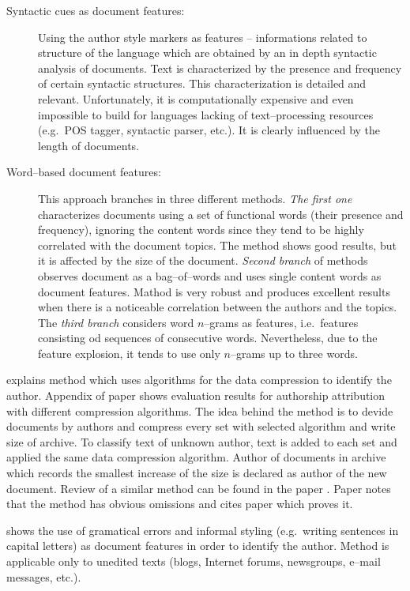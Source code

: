 \documentclass[11pt,english]{article}
\begin{document}
\begin{multicols}{2}
\begin{description}
\item[Syntactic cues as document features:] Using the author style markers as
features -- informations related to structure of the language which are obtained
by an in depth syntactic analysis of documents. Text is characterized by the
presence and frequency of certain syntactic structures. This characterization is
detailed and relevant. Unfortunately, it is computationally expensive and even
impossible to build for languages lacking of text--processing resources (e.g.\
POS tagger, syntactic parser, etc.). It is clearly influenced by the length of
documents.

\item[Word--based document features:] This approach branches in three different
methods. \emph{The first one} characterizes documents using a set of functional
words (their presence and frequency), ignoring the content words since they tend
to be highly correlated with the document topics. The method shows good results,
but it is affected by the size of the document. \emph{Second branch} of methods
observes document as a bag--of--words and uses single content words as document
features. Mathod is very robust and produces excellent results when there is a
noticeable correlation between the authors and the topics. The \emph{third
branch} considers word $n$--grams as features, i.e.\ features consisting od
sequences of consecutive words. Nevertheless, due to the feature explosion, it
tends to use only $n$--grams up to three words.
\end{description}

\citet{kukushkina2001using} explains method which uses algorithms for the data
compression to identify the author. Appendix of paper shows evaluation results
for authorship attribution with different compression algorithms. The idea behind
the method is to devide documents by authors and compress every set with selected
algorithm and write size of archive. To classify text of unknown author, text is
added to each set and applied the same data compression algorithm. Author of
documents in archive which records the smallest increase of the size is declared
as author of the new document. Review of a similar method can be found in the
paper \citep{zhao2005effective}. Paper notes that the method has obvious
omissions and cites paper which proves it.

\citet{koppel2003exploiting} shows the use of gramatical errors and informal
styling (e.g.\ writing sentences in capital letters) as document features in
order to identify the author. Method is applicable only to unedited texts (blogs,
Internet forums, newsgroups, e--mail messages, etc.).


\end{multicols}
\end{document}
